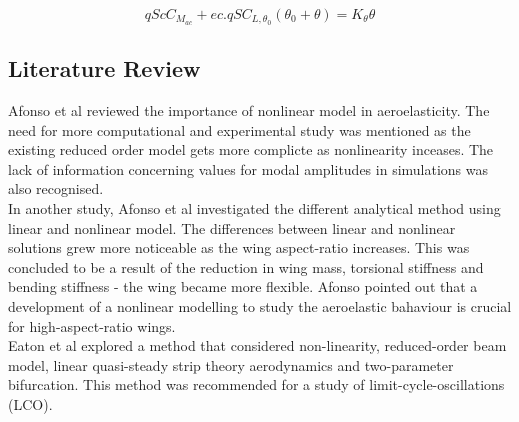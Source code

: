 \documentclass[11pt]{article}
\begin{document}

\begin{equation}
qScC_{M_{ac}} + ec. qSC_{L,{\theta _0}}(\theta _0 + \theta) = K_{\theta}\theta
\end{equation}



\subsection{Literature Review}
Afonso et al\cite{Afonso2017AWings} reviewed the importance of nonlinear model in aeroelasticity. The need for more computational and experimental study was mentioned as the existing reduced order model gets more complicte as nonlinearity inceases. The lack of information concerning values for modal amplitudes in simulations was also recognised.\\

In another study, Afonso et al \cite{Afonso2015LINEARWINGS} investigated the different analytical method using linear and nonlinear model. The differences between linear and nonlinear solutions grew more noticeable as the wing aspect-ratio increases. This was concluded to be a result of the reduction in wing mass, torsional stiffness and bending stiffness - the wing became more flexible. Afonso pointed out that a development of a nonlinear modelling to study the aeroelastic bahaviour is crucial for high-aspect-ratio wings.\\

Eaton et al \cite{EatonNumericalWings} explored a method that considered non-linearity, reduced-order beam model, linear quasi-steady strip theory aerodynamics and two-parameter bifurcation. This method was recommended for a study of limit-cycle-oscillations (LCO).\\
\end{document}
